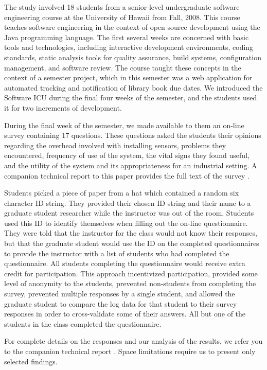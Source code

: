 \documentclass{acm_proc_article-sp}
\begin{document}
The study involved 18 students from a senior-level undergraduate software
engineering course at the University of Hawaii from Fall, 2008. This course
teaches software engineering in the context of open source development
using the Java programming language.  The first several weeks are concerned
with basic tools and technologies, including interactive development
environments, coding standards, static analysis tools for quality
assurance, build systems, configuration management, and software review.
The course taught these concepts in the context of a semester project,
which in this semester was a web application for automated tracking and
notification of library book due dates.  We introduced the Software ICU
during the final four weeks of the semester, and the students used it for
two increments of development.

During the final week of the semester, we made available to them an on-line
survey containing 17 questions.  These questions asked the students their
opinions regarding the overhead involved with installing sensors, problems
they encountered, frequency of use of the system, the vital signs they
found useful, and the utility of the system and its appropriateness for an
industrial setting.  A companion technical report to this paper provides
the full text of the survey \cite{csdl2-09-03}.

Students picked a piece of paper from a hat which contained a random six
character ID string.  They provided their chosen ID string and their name
to a graduate student researcher while the instructor was out of the room.
Students used this ID to identify themselves when filling out the on-line
questionnaire.  They were told that the instructor for the class would not
know their responses, but that the graduate student would use the ID on the
completed questionnaires to provide the instructor with a list of students
who had completed the questionnaire.  All students completing the
questionnaire would receive extra credit for participation.  This approach
incentivized participation, provided some level of anonymity to the
students, prevented non-students from completing the survey, prevented
multiple responses by a single student, and allowed the graduate student to
compare the log data for that student to their survey responses in order to
cross-validate some of their answers. All but one of the students in the
class completed the questionnaire.

For complete details on the responses and our analysis of the results, we 
refer you to the companion technical report \cite{csdl2-09-03}.  Space limitations 
require us to present only selected findings. 
\end{document}
